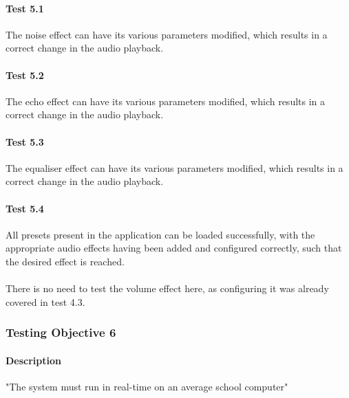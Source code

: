 \paragraph{Test 5.1} The noise effect can have its various parameters modified, which results in a correct change in the audio playback.
\paragraph{Test 5.2} The echo effect can have its various parameters modified, which results in a correct change in the audio playback.
\paragraph{Test 5.3} The equaliser effect can have its various parameters modified, which results in a correct change in the audio playback.
\paragraph{Test 5.4} All presets present in the application can be loaded successfully, with the appropriate audio effects having been added and configured correctly, such that the desired effect is reached.

\paragraph{}
There is no need to test the volume effect here, as configuring it was already covered in test 4.3.

\pagebreak
\subsubsection{Testing Objective 6}
\paragraph{Description}  "The system must run in real-time on an average school computer"


